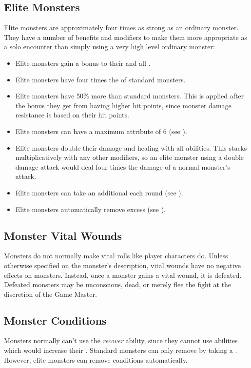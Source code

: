    \subsection{Elite Monsters}\label{Elite Monsters}
        Elite monsters are approximately four times as strong as an ordinary monster.
        They have a number of benefits and modifiers to make them more appropriate as a solo encounter than simply using a very high level ordinary monster:
        \begin{itemize}
            \item Elite monsters gain a  bonus to their  and all .
            \item Elite monsters have four times the  of standard monsters.
            \item Elite monsters have 50\% more  than standard monsters. This is applied after the bonus they get from having higher hit points, since monster damage resistance is based on their hit points.
            \item Elite monsters can have a maximum attribute of 6 (see ).
            \item Elite monsters double their damage and healing with all abilities. This stacks multiplicatively with any other modifiers, so an elite monster using a double damage attack would deal four times the damage of a normal monster's attack.
            \item Elite monsters can take an additional  each round (see ).
            \item Elite monsters automatically remove excess  (see ).
        \end{itemize}

        \subsection{Monster Vital Wounds}
            Monsters do not normally make vital rolls like player characters do.
            Unless otherwise specified on the monster's description, vital wounds have no negative effects on monsters.
            Instead, once a monster gains a vital wound, it is defeated.
            Defeated monsters may be unconscious, dead, or merely flee the fight at the discretion of the Game Master.

        \subsection{Monster Conditions}\label{Monster Conditions}
            Monsters normally can't use the \textit{recover} ability, since they cannot use abilities which would increase their .
            Standard monsters can only remove  by taking a .
            However, elite monsters can remove conditions automatically.

